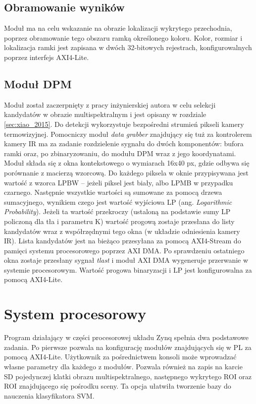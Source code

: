 \subsection{Obramowanie wyników}
Moduł ma na celu wskazanie na obrazie lokalizacji wykrytego przechodnia, poprzez obramowanie tego obszaru ramką określonego koloru. Kolor, rozmiar i lokalizacja ramki jest zapisana w dwóch 32-bitowych rejestrach, konfigurowalnych poprzez interfejs AXI4-Lite. 
\subsection{Moduł DPM}
Moduł został zaczerpnięty z pracy inżynierskiej autora w celu selekcji kandydatów w obrazie multispektralnym i jest opisany w rozdziale \ref {sec:xiao_2015}.  Do detekcji wykorzystuje bezpośredni strumień pikseli kamery termowizyjnej. Pomocniczy moduł \textit{data grabber} znajdujący się tuż za kontrolerem kamery IR ma za zadanie rozdzielenie sygnału do dwóch komponentów: bufora ramki oraz, po zbinaryzowaniu, do modułu DPM wraz z jego koordynatami. Moduł składa się z okna kontekstowego o wymiarach 16x40 px, gdzie odbywa się porównanie z macierzą wzorcową. Do każdego piksela w oknie przypisywana jest wartość z wzorca LPBW – jeżeli piksel jest biały, albo LPMB w przypadku czarnego. Następnie wszystkie wartości są sumowane za pomocą drzewa sumacyjnego, wynikiem czego jest wartość wyjściowa LP (ang. \textit{Logarithmic Probability}). Jeżeli ta wartość przekroczy (ustaloną na podstawie sumy LP policzoną dla tła i parametru K) wartość progową zostaje przesłana do listy kandydatów wraz z współrzędnymi tego okna (w układzie odniesienia kamery IR). Lista kandydatów jest na bieżąco przesyłana za pomocą AXI4-Stream do pamięci systemu procesorowego poprzez AXI DMA. Po sprawdzeniu ostatniego okna zostaje przesłany sygnał \textit{tlast} i moduł AXI DMA wygeneruje przerwanie w systemie procesorowym. Wartość progowa binaryzacji i LP jest konfigurowalna za pomocą AXI4-Lite.
\section{System procesorowy}
Program działający w części procesorowej układu Zynq spełnia dwa podstawowe zadania. Po pierwsze pozwala na konfigurację modułów znajdujących się w PL za pomocą AXI4-Lite. Użytkownik za pośrednictwem konsoli może wprowadzać własne parametry dla każdego z modułów. Pozwala również na zapis na karcie SD pojedynczej klatki obrazu multispektralnego, następnego wykrytego ROI oraz ROI znajdującego się pośrodku sceny. Ta opcja ułatwiła tworzenie bazy do nauczenia klasyfikatora SVM. 


